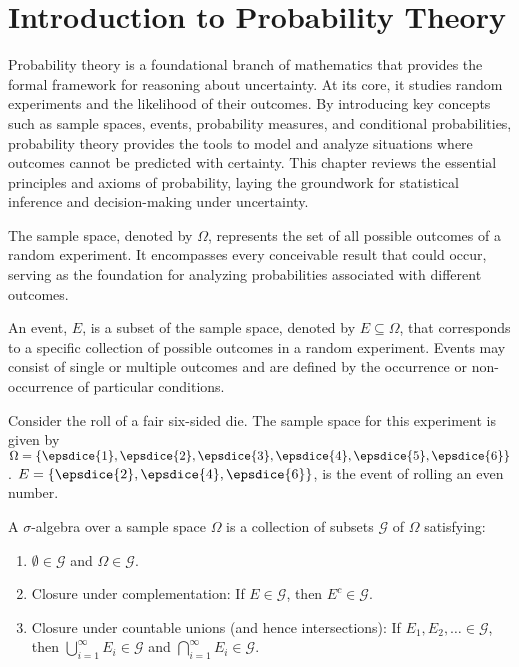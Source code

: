 \chapter{Introduction to Probability Theory}
\label{chp:probaiblity_theory}
Probability theory is a foundational branch of mathematics that provides the formal framework for reasoning about uncertainty. At its core, it studies random experiments and the likelihood of their outcomes. By introducing key concepts such as sample spaces, events, probability measures, and conditional probabilities, probability theory provides the tools to model and analyze situations where outcomes cannot be predicted with certainty. This chapter reviews the essential principles and axioms of probability, laying the groundwork for statistical inference and decision-making under uncertainty.

\begin{definition}
	\label{def:sample_space}
	The sample space, denoted by $\Omega$, represents the set of all possible outcomes of a random experiment. It encompasses every conceivable result that could occur, serving as the foundation for analyzing probabilities associated with different outcomes.
\end{definition}

\begin{definition}[Event]
	An event, $E$, is a subset of the sample space, denoted by $E \subseteq \Omega$, that corresponds to a specific collection of possible outcomes in a random experiment. Events may consist of single or multiple outcomes and are defined by the occurrence or non-occurrence of particular conditions.
\end{definition}

\begin{example}
	\label{ex:die1}
	Consider the roll of a fair six-sided die. The sample space for this experiment is given by $\Omega = \{ \epsdice{1}, \epsdice{2}, \epsdice{3}, \epsdice{4}, \epsdice{5}, \epsdice{6} \}$. $E = \{\epsdice{2}, \epsdice{4}, \epsdice{6}\}$, is the event of rolling an even number. 
\end{example}

\begin{definition}
	\label{def:sigma_algebra}
	A $\sigma$-algebra over a sample space $\Omega$ is a collection of subsets $\mathcal{G}$ of $\Omega$ satisfying:
	\begin{enumerate}
		\item $\emptyset \in \mathcal{G}$ and $\Omega \in \mathcal{G}$.
		\item Closure under complementation: If $E \in \mathcal{G}$, then $E^c \in \mathcal{G}$.
		\item Closure under countable unions (and hence intersections): If $E_1, E_2, \dots \in \mathcal{G}$, then $\bigcup_{i=1}^\infty E_i \in \mathcal{G}$ and $\bigcap_{i=1}^\infty E_i \in \mathcal{G}$.
	\end{enumerate}
\end{definition}

